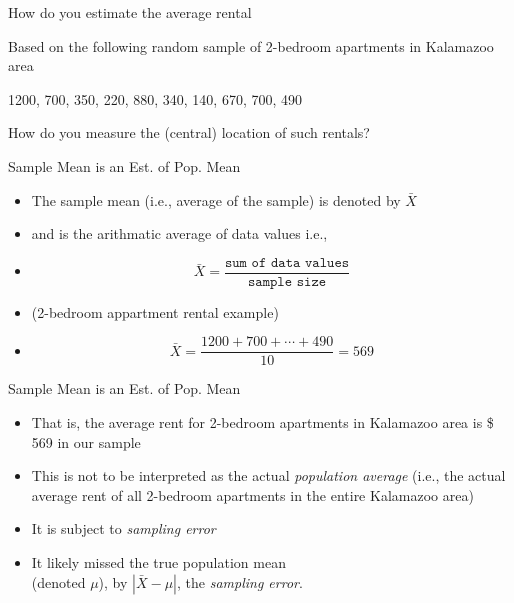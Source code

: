 \documentclass[14pt]{beamer}\usepackage[]{graphicx}\usepackage[]{color}
\begin{document}
\begin{frame}[fragile]{How do you estimate the average rental}

Based on the following random sample of 2-bedroom apartments in Kalamazoo area

\vspace{3mm}



  1200, 700, 350, 220, 880, 340, 140, 670, 700, 490
  
\vspace{3mm}

  How do you measure the (central) location of such rentals?

\end{frame}

\begin{frame}[fragile]{Sample Mean is an Est. of Pop. Mean}

\begin{itemize}
\item<1-> The sample mean (i.e., average of the sample) is denoted by $\bar{X}$
\item<2-> and is the arithmatic average of data values  i.e.,
\item<3->
\begin{equation*}
\bar{X} = \frac{\texttt{sum of data values}}{\texttt{sample size}}
\end{equation*}
\item<4-> (2-bedroom appartment rental example)
\item<5->
\begin{equation*}
\bar{X} = \frac{1200 + 700 + \cdots + 490}{10} = 569
\end{equation*}
\end{itemize}

\end{frame}
 
\begin{frame}[fragile]{Sample Mean is an Est. of Pop. Mean}

\begin{itemize}
\item<1-> That is, the average rent for 2-bedroom apartments in  Kalamazoo area is \$ 569 in our sample
\item<2-> This is not to be interpreted as the actual \textit{population average}  (i.e., the actual average rent of all 2-bedroom apartments in  the entire Kalamazoo area)
\item<3-> It is subject to \textit{sampling error}
\item<4-> It likely missed the true population mean \\ (denoted $\mu$), by $| \bar{X} - \mu |$,  the \textit{sampling error}.
\end{itemize}

\end{frame}
\end{document}
